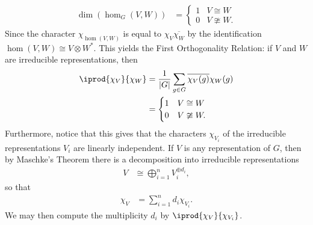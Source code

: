 \documentclass[10pt]{mypackage}
\begin{document}
\begin{align*}
  \dim\left( \hom_G\left( V,W \right) \right) &= \begin{cases}
    1 & V\cong W\\
    0 & V\ncong W.
  \end{cases}
\end{align*}
Since the character $\chi_{\hom\left( V,W \right)}$ is equal to $ \chi_V \overline{\chi_W} $ by the identification $\hom\left( V,W \right)\cong V\otimes W^{\ast}$. This yields the First Orthogonality Relation: if $V$ and $W$ are irreducible representations, then
\begin{align*}
  \iprod{\chi_V}{\chi_W} &= \frac{1}{\left\vert G \right\vert} \sum_{g\in G} \overline{\chi_V(g)}\chi_W(g)\\
                         &= \begin{cases}
                           1 & V\cong W\\
                           0 & V\ncong W.
                         \end{cases}
\end{align*}
Furthermore, notice that this gives that the characters $\chi_{V_i}$ of the irreducible representations $V_i$ are linearly independent. If $V$ is any representation of $G$, then by Maschke's Theorem there is a decomposition into irreducible representations
\begin{align*}
  V &\cong \bigoplus_{i=1}^{n} V_i^{\oplus d_i},
\end{align*}
so that
\begin{align*}
  \chi_V &= \sum_{i=1}^{n}d_i\chi_{V_i}.
\end{align*}
We may then compute the multiplicity $d_i$ by $ \iprod{\chi_V}{\chi_{V_i}} $.
\end{document}
